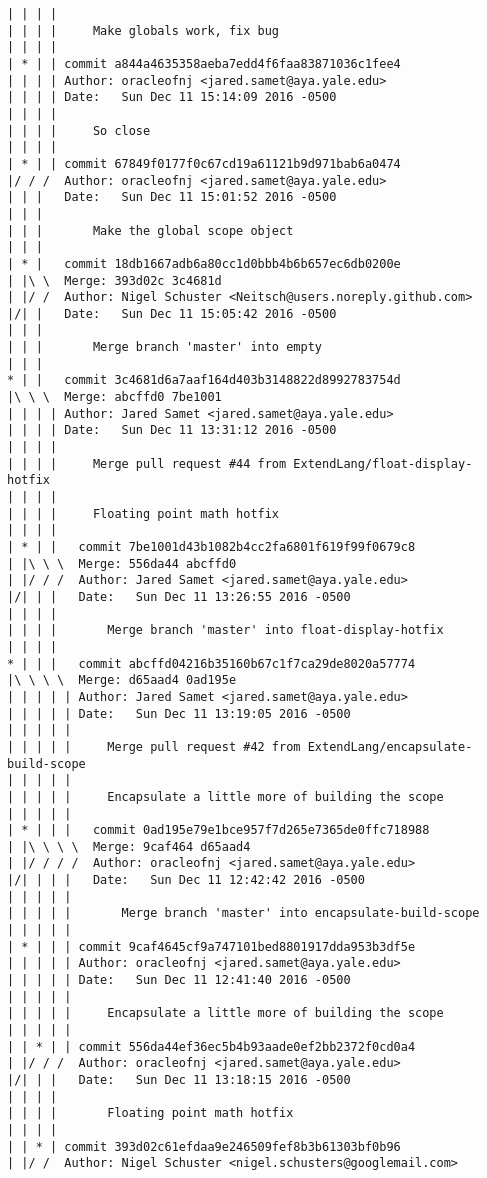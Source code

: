 \begin{lstlisting}
| | | | 
| | | |     Make globals work, fix bug
| | | |     
| * | | commit a844a4635358aeba7edd4f6faa83871036c1fee4
| | | | Author: oracleofnj <jared.samet@aya.yale.edu>
| | | | Date:   Sun Dec 11 15:14:09 2016 -0500
| | | | 
| | | |     So close
| | | |     
| * | | commit 67849f0177f0c67cd19a61121b9d971bab6a0474
|/ / /  Author: oracleofnj <jared.samet@aya.yale.edu>
| | |   Date:   Sun Dec 11 15:01:52 2016 -0500
| | |   
| | |       Make the global scope object
| | |      
| * |   commit 18db1667adb6a80cc1d0bbb4b6b657ec6db0200e
| |\ \  Merge: 393d02c 3c4681d
| |/ /  Author: Nigel Schuster <Neitsch@users.noreply.github.com>
|/| |   Date:   Sun Dec 11 15:05:42 2016 -0500
| | |   
| | |       Merge branch 'master' into empty
| | |      
* | |   commit 3c4681d6a7aaf164d403b3148822d8992783754d
|\ \ \  Merge: abcffd0 7be1001
| | | | Author: Jared Samet <jared.samet@aya.yale.edu>
| | | | Date:   Sun Dec 11 13:31:12 2016 -0500
| | | | 
| | | |     Merge pull request #44 from ExtendLang/float-display-hotfix
| | | |     
| | | |     Floating point math hotfix
| | | |       
| * | |   commit 7be1001d43b1082b4cc2fa6801f619f99f0679c8
| |\ \ \  Merge: 556da44 abcffd0
| |/ / /  Author: Jared Samet <jared.samet@aya.yale.edu>
|/| | |   Date:   Sun Dec 11 13:26:55 2016 -0500
| | | |   
| | | |       Merge branch 'master' into float-display-hotfix
| | | |       
* | | |   commit abcffd04216b35160b67c1f7ca29de8020a57774
|\ \ \ \  Merge: d65aad4 0ad195e
| | | | | Author: Jared Samet <jared.samet@aya.yale.edu>
| | | | | Date:   Sun Dec 11 13:19:05 2016 -0500
| | | | | 
| | | | |     Merge pull request #42 from ExtendLang/encapsulate-build-scope
| | | | |     
| | | | |     Encapsulate a little more of building the scope
| | | | |        
| * | | |   commit 0ad195e79e1bce957f7d265e7365de0ffc718988
| |\ \ \ \  Merge: 9caf464 d65aad4
| |/ / / /  Author: oracleofnj <jared.samet@aya.yale.edu>
|/| | | |   Date:   Sun Dec 11 12:42:42 2016 -0500
| | | | |   
| | | | |       Merge branch 'master' into encapsulate-build-scope
| | | | |      
| * | | | commit 9caf4645cf9a747101bed8801917dda953b3df5e
| | | | | Author: oracleofnj <jared.samet@aya.yale.edu>
| | | | | Date:   Sun Dec 11 12:41:40 2016 -0500
| | | | | 
| | | | |     Encapsulate a little more of building the scope
| | | | |      
| | * | | commit 556da44ef36ec5b4b93aade0ef2bb2372f0cd0a4
| |/ / /  Author: oracleofnj <jared.samet@aya.yale.edu>
|/| | |   Date:   Sun Dec 11 13:18:15 2016 -0500
| | | |   
| | | |       Floating point math hotfix
| | | |     
| | * | commit 393d02c61efdaa9e246509fef8b3b61303bf0b96
| |/ /  Author: Nigel Schuster <nigel.schusters@googlemail.com>

\end{lstlisting}

